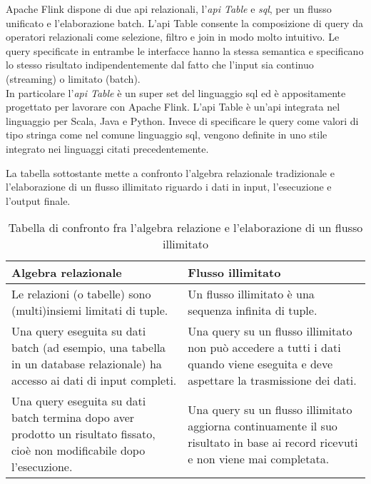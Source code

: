 Apache Flink dispone di due \gls{api} relazionali, l'\textit{\gls{api} Table} e \textit{\gls{sql}}, per un flusso unificato e l'elaborazione batch. L'\gls{api} Table consente la composizione di \gls{query} da operatori relazionali come selezione, filtro e join in modo molto intuitivo. Le \gls{query} specificate in entrambe le interfacce hanno la stessa semantica e specificano lo stesso risultato indipendentemente dal fatto che l'input sia continuo (streaming) o limitato (batch).\\
In particolare l'\textit{\gls{api} Table} è un super set del linguaggio \gls{sql} ed è appositamente progettato per lavorare con Apache Flink. L'\gls{api} Table è un'\gls{api} integrata nel linguaggio per Scala, Java e Python. Invece di specificare le \gls{query} come valori di tipo stringa come nel comune linguaggio \gls{sql}, vengono definite in uno stile integrato nei linguaggi citati precedentemente.

La tabella sottostante mette a confronto l'algebra relazionale tradizionale e l'elaborazione di un flusso illimitato riguardo i dati in input, l'esecuzione e l'output finale.

\begin{table}[H]
\caption{Tabella di confronto fra l'algebra relazione e l'elaborazione di un flusso illimitato}
\label{tab:algebraRelazionale-flussoIllimitato}
\begin{tabularx}{\textwidth}{XX}
\hline
\textbf{Algebra relazionale} & \textbf{Flusso illimitato}\\
\hline
Le relazioni (o tabelle) sono (multi)insiemi limitati di tuple.     & Un flusso illimitato è una sequenza infinita di tuple. \\
\hline
Una \gls{query} eseguita su dati batch (ad esempio, una tabella in un database relazionale) ha accesso ai dati di input completi.    & Una \gls{query} su un flusso illimitato non può accedere a tutti i dati quando viene eseguita e deve aspettare la trasmissione dei dati. \\
\hline
Una \gls{query} eseguita su dati batch termina dopo aver prodotto un risultato fissato, cioè non modificabile dopo l'esecuzione. & Una \gls{query} su un flusso illimitato aggiorna continuamente il suo risultato in base ai record ricevuti e non viene mai completata. \\
\hline
\end{tabularx}
\end{table}%


